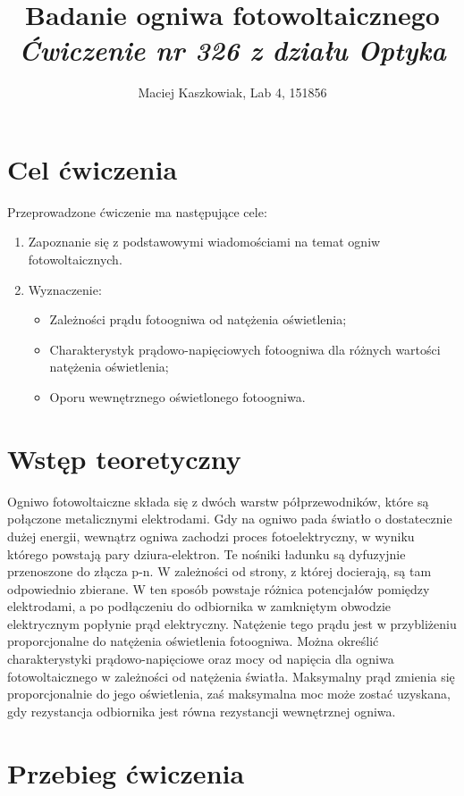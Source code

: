 \documentclass[polish, a4paper]{article}
\title{Badanie ogniwa fotowoltaicznego\\
        \Large \emph{Ćwiczenie nr 326 z działu Optyka}}
\author{Maciej Kaszkowiak, Lab 4, 151856}
\date{\vspace{-5ex}} %
\begin{document}
\maketitle

\section{Cel ćwiczenia}
Przeprowadzone ćwiczenie ma następujące cele:
\begin{enumerate}
\item{Zapoznanie się z podstawowymi wiadomościami na temat ogniw fotowoltaicznych. }
\item{Wyznaczenie:}
\begin{itemize}
\item{Zależności prądu fotoogniwa od natężenia oświetlenia;}
\item{Charakterystyk prądowo-napięciowych fotoogniwa dla różnych wartości natężenia oświetlenia;}
\item{Oporu wewnętrznego oświetlonego fotoogniwa.}
\end{itemize}
\end{enumerate}
\section{Wstęp teoretyczny}

Ogniwo fotowoltaiczne składa się z dwóch warstw półprzewodników, które są połączone metalicznymi elektrodami. Gdy na ogniwo pada światło o dostatecznie dużej energii, wewnątrz ogniwa zachodzi proces fotoelektryczny, w wyniku którego powstają pary dziura-elektron. Te nośniki ładunku są dyfuzyjnie przenoszone do złącza p-n. W zależności od strony, z której docierają, są tam odpowiednio zbierane. W ten sposób powstaje różnica potencjałów pomiędzy elektrodami, a po podłączeniu do odbiornika w zamkniętym obwodzie elektrycznym popłynie prąd elektryczny. Natężenie tego prądu jest w przybliżeniu proporcjonalne do natężenia oświetlenia fotoogniwa. Można określić charakterystyki prądowo-napięciowe oraz mocy od napięcia dla ogniwa fotowoltaicznego w zależności od natężenia światła. Maksymalny prąd zmienia się proporcjonalnie do jego oświetlenia, zaś maksymalna moc może zostać uzyskana, gdy rezystancja odbiornika jest równa rezystancji wewnętrznej ogniwa.



\section{Przebieg ćwiczenia}
\end{document}
